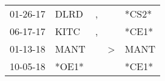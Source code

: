 \begin{supertabular}{p{0.07\textwidth}p{0.06\textwidth}p{0.02\textwidth}p{0.02\textwidth}p{0.06\textwidth}}
          01-26-17\textsuperscript{} &           DLRD\textsuperscript{} &                , &               &                            *CS2* \\
          06-17-17\textsuperscript{} &           KITC\textsuperscript{} &                , &               &                            *CE1* \\
          01-13-18\textsuperscript{} &           MANT\textsuperscript{} &                  &  \textgreater &           MANT\textsuperscript{} \\
          10-05-18\textsuperscript{} &                            *OE1* &                  &               &                            *CE1* \\
\end{supertabular}
